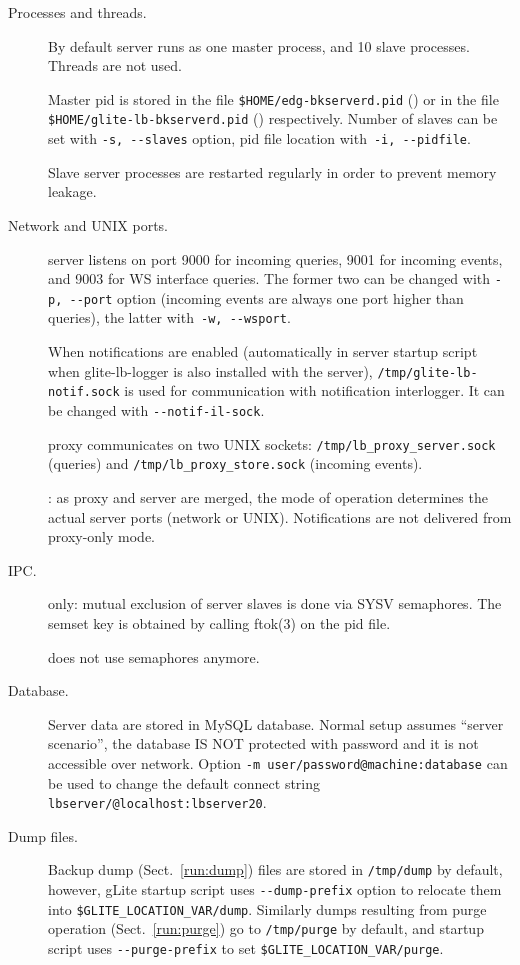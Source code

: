 \begin{description}
\item[Processes and threads.]
By default \LB server runs as one master process,
and 10 slave processes.
Threads are not used.

Master pid is stored in the file \verb'$HOME/edg-bkserverd.pid' ()
or in the file \verb'$HOME/glite-lb-bkserverd.pid' () respectively.
Number of slaves can be set with \verb'-s, --slaves' option,
pid file location with~\verb'-i, --pidfile'.

Slave server processes are restarted regularly in order to prevent
memory leakage.

\item[Network and UNIX ports.]
\LB server listens on port 9000 for incoming queries,
9001 for incoming events, and 9003 for WS interface queries.
The former two can be changed with \verb'-p, --port' option
(incoming events are always one port higher than queries), 
the latter with~\verb'-w, --wsport'.

When \LB notifications are enabled (automatically in server startup script when 
glite-lb-logger is also installed with the server), 
\verb'/tmp/glite-lb-notif.sock' is used for communication with notification interlogger.
It can be changed with \verb'--notif-il-sock'.

\LB proxy communicates on two UNIX sockets:
\verb'/tmp/lb_proxy_server.sock' (queries) and 
\verb'/tmp/lb_proxy_store.sock' (incoming events).

: as proxy and server are merged, the mode of operation determines
the actual server ports (network or UNIX).
Notifications are not delivered from proxy-only mode.

\item[IPC.]  only: mutual exclusion of server slaves is done
via SYSV semaphores. The semset key is obtained by calling ftok(3) on 
the pid file.

 does not use semaphores anymore.

\item[Database.]
Server data are stored in MySQL database. Normal setup assumes ``server scenario'', 
\ie the database IS NOT protected with password and it is not accessible over network.
Option \verb'-m user/password@machine:database' can be used to change
the default connect string \verb'lbserver/@localhost:lbserver20'.

\item[Dump files.]
Backup dump (Sect.~\ref{run:dump}) files are stored in
\verb'/tmp/dump' by default, however, gLite startup script uses
\verb'--dump-prefix' option to relocate them into \verb'$GLITE_LOCATION_VAR/dump'.
Similarly dumps resulting from purge operation (Sect.~\ref{run:purge})
go to \verb'/tmp/purge' by default, and startup script uses \verb'--purge-prefix'
to set \verb'$GLITE_LOCATION_VAR/purge'.


\end{description}
